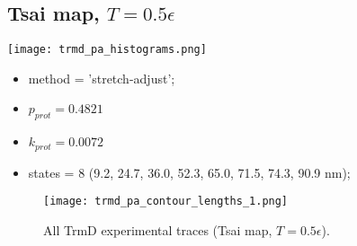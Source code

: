 \subsection{Tsai map, $T=0.5\epsilon$}
\label{subsec:trmd-pa}
\begin{minipage}[c]{0.7\textwidth}
    \texttt{[image: trmd\_pa\_histograms.png]}
\end{minipage}
\hfill
\begin{minipage}[c]{0.45\textwidth}
    \begin{itemize}
        \item method = 'stretch-adjust';
        \item $p_{prot}=0.4821$
        \item $k_{prot}=0.0072$
        \item states = 8 (9.2, 24.7, 36.0, 52.3, 65.0, 71.5, 74.3, 90.9 nm);
    \end{itemize}
\end{minipage}

\begin{figure}
    \centering
    \texttt{[image: trmd\_pa\_contour\_lengths\_1.png]}
    \caption{All TrmD experimental traces (Tsai map, $T=0.5\epsilon$).}
    \label{fig:trmd-pa-cl1}
\end{figure}

